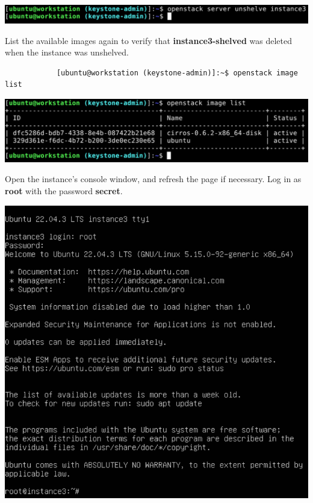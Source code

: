 \documentclass[letterpaper, 12pt]{article}
\begin{document}
\begin{enumerate}
\begin{labstep}
        \begin{center}
            \includegraphics[width=\linewidth]{images/part6/step11.png}
        \end{center}
    \end{labstep}

    \begin{labstep}
        List the available images again to verify that \textbf{instance3-shelved} was deleted when the instance was unshelved.
        \begin{lstlisting}
            [ubuntu@workstation (keystone-admin)]:~$ openstack image list
        \end{lstlisting}

        \begin{center}
            \includegraphics[width=\linewidth]{images/part6/step12.png}
        \end{center}
    \end{labstep}

    \begin{labstep}
        Open the instance's console window, and refresh the page if necessary.
        Log in as \textbf{root} with the password \textbf{secret}.

        \begin{center}
            \includegraphics[width=\linewidth]{images/part6/step13.png}
        \end{center}
    \end{labstep}


\end{enumerate}
\end{document}
